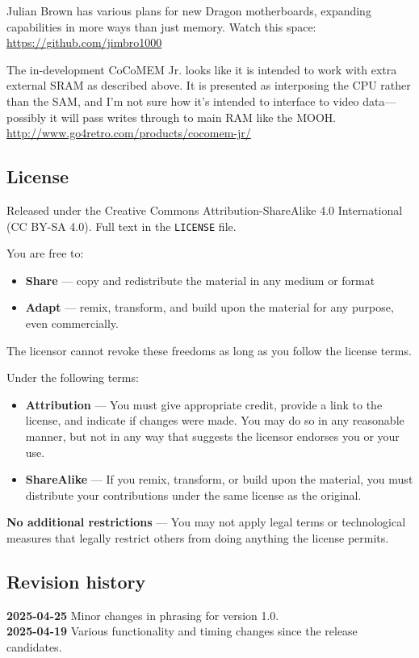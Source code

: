 \documentclass[12pt]{article}
\begin{document}
Julian Brown has various plans for new Dragon motherboards, expanding
capabilities in more ways than just memory.  Watch this space:
\href{https://github.com/jimbro1000}{https://github.com/jimbro1000}

The in-development CoCoMEM Jr. looks like it is intended to work with extra
external SRAM as described above.  It is presented as interposing the CPU
rather than the SAM, and I'm not sure how it's intended to interface to video
data---possibly it will pass writes through to main RAM like the MOOH.
\href{http://www.go4retro.com/products/cocomem-jr/}{http://www.go4retro.com/products/cocomem-jr/}


\subsection*{License}

Released under the Creative Commons Attribution-ShareAlike 4.0 International
(CC BY-SA 4.0).  Full text in the \texttt{LICENSE} file.

You are free to:

\begin{itemize}
\item \textbf{Share} --- copy and redistribute the material in any medium or
format
\item \textbf{Adapt} --- remix, transform, and build upon the material for any purpose,
even commercially.
\end{itemize}

The licensor cannot revoke these freedoms as long as you follow the license terms.

Under the following terms:

\begin{itemize}
\item \textbf{Attribution} --- You must give appropriate credit, provide a link to the license, and indicate if changes were made. You may do so in any reasonable manner, but not in any way that suggests the licensor endorses you or your use.

\item \textbf{ShareAlike} --- If you remix, transform, or build upon the material, you must distribute your contributions under the same license as the original.
\end{itemize}

\textbf{No additional restrictions} --- You may not apply legal terms or technological measures that legally restrict others from doing anything the license permits.


\subsection*{Revision history}

\textbf{2025-04-25} Minor changes in phrasing for version 1.0.\\
\textbf{2025-04-19} Various functionality and timing changes since the release candidates.
\end{document}
